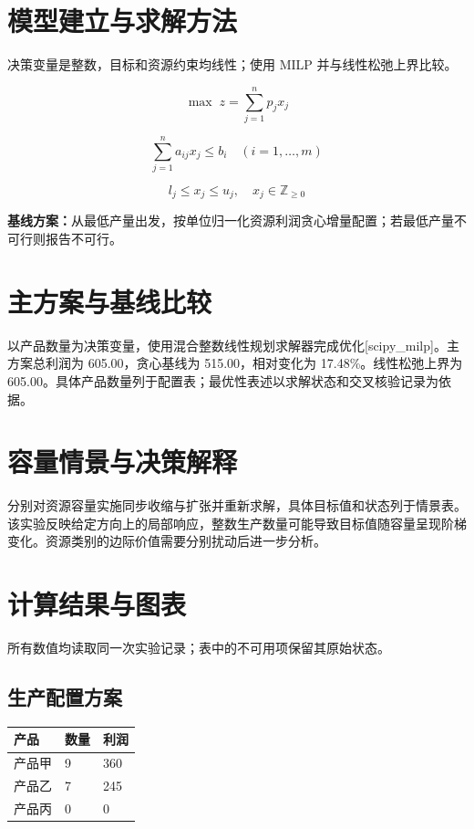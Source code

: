 \documentclass[UTF8,a4paper,11pt,fontset=fandol]{ctexart}
\begin{document}
\section{模型建立与求解方法}
决策变量是整数，目标和资源约束均线性；使用 MILP 并与线性松弛上界比较。

\begin{equation}
\max\; z=\sum_{j=1}^{n}p_jx_j
\end{equation}

\begin{equation}
\sum_{j=1}^{n}a_{ij}x_j\leq b_i\quad(i=1,\ldots,m)
\end{equation}

\begin{equation}
l_j\leq x_j\leq u_j,\quad x_j\in\mathbb{Z}_{\geq0}
\end{equation}

\noindent\textbf{基线方案：}从最低产量出发，按单位归一化资源利润贪心增量配置；若最低产量不可行则报告不可行。


\section{主方案与基线比较}
以产品数量为决策变量，使用混合整数线性规划求解器完成优化[scipy\_milp]。主方案总利润为 605.00，贪心基线为 515.00，相对变化为 17.48\%。线性松弛上界为 605.00。具体产品数量列于配置表；最优性表述以求解状态和交叉核验记录为依据。

\section{容量情景与决策解释}
分别对资源容量实施同步收缩与扩张并重新求解，具体目标值和状态列于情景表。该实验反映给定方向上的局部响应，整数生产数量可能导致目标值随容量呈现阶梯变化。资源类别的边际价值需要分别扰动后进一步分析。


\section{计算结果与图表}
所有数值均读取同一次实验记录；表中的不可用项保留其原始状态。

\subsection*{生产配置方案}
{\small
\begin{longtable}{lll}
\toprule
产品 & 数量 & 利润 \\ 
\midrule\endhead

产品甲 & 9 & 360 \\ 

产品乙 & 7 & 245 \\ 

产品丙 & 0 & 0 \\ 

\bottomrule
\end{longtable}}
\end{document}
